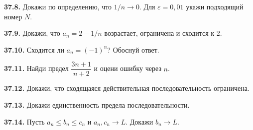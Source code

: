 \noindent\begin{minipage}[t]{\linewidth}\textbf{37.8.} Докажи по определению, что \(1/n\to0\). Для \(\varepsilon=0{,}01\) укажи подходящий номер \(N\).\par\end{minipage}\par
\noindent\begin{minipage}[t]{\linewidth}\textbf{37.9.} Докажи, что \(a_n=2-1/n\) возрастает, ограничена и сходится к \(2\).\par\end{minipage}\par
\noindent\begin{minipage}[t]{\linewidth}\textbf{37.10.} Сходится ли \(a_n=(-1)^n\)? Обоснуй ответ.\par\end{minipage}\par
\noindent\begin{minipage}[t]{\linewidth}\textbf{37.11.} Найди предел \(\dfrac{3n+1}{n+2}\) и оцени ошибку через \(n\).\par\end{minipage}\par
\noindent\begin{minipage}[t]{\linewidth}\textbf{37.12.}\starmark{} Докажи, что сходящаяся действительная последовательность ограничена.\par\end{minipage}\par
\noindent\begin{minipage}[t]{\linewidth}\textbf{37.13.}\starmark{} Докажи единственность предела последовательности.\par\end{minipage}\par
\noindent\begin{minipage}[t]{\linewidth}\textbf{37.14.}\starmark{} Пусть \(a_n\le b_n\le c_n\) и \(a_n,c_n\to L\). Докажи \(b_n\to L\).\par\end{minipage}\par
\endgroup
